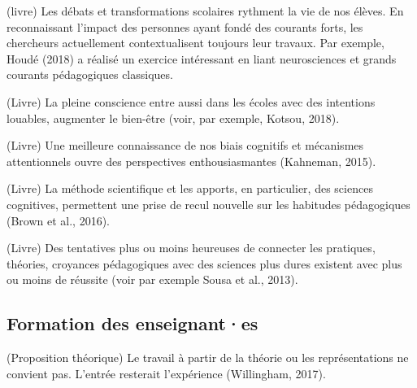 \documentclass[
  french,
]{article}
\begin{document}
(livre) Les débats et transformations scolaires rythment la vie de nos élèves. En reconnaissant l'impact des personnes ayant fondé des courants forts, les chercheurs actuellement contextualisent toujours leur travaux. Par exemple, Houdé (2018) a réalisé un exercice intéressant en liant neurosciences et grands courants pédagogiques classiques.

(Livre) La pleine conscience entre aussi dans les écoles avec des intentions louables, augmenter le bien-être (voir, par exemple, Kotsou, 2018).

(Livre) Une meilleure connaissance de nos biais cognitifs et mécanismes attentionnels ouvre des perspectives enthousiasmantes (Kahneman, 2015).

(Livre) La méthode scientifique et les apports, en particulier, des sciences cognitives, permettent une prise de recul nouvelle sur les habitudes pédagogiques (Brown et al., 2016).

(Livre) Des tentatives plus ou moins heureuses de connecter les pratiques, théories, croyances pédagogiques avec des sciences plus dures existent avec plus ou moins de réussite (voir par exemple Sousa et al., 2013).

\hypertarget{formation-des-enseignantes}{%
\subsection{Formation des enseignant·es}\label{formation-des-enseignantes}}

(Proposition théorique) Le travail à partir de la théorie ou les représentations ne convient pas. L'entrée resterait l'expérience (Willingham, 2017).
\end{document}
